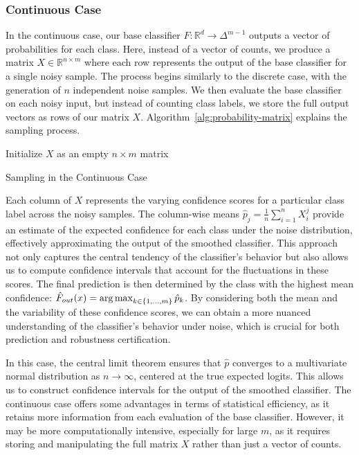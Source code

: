 \subsubsection{Continuous Case}\label{subsubsec:continuous-case-monte-carlo-simulation}
In the continuous case, our base classifier $F: \mathbb{R}^d \rightarrow \Delta^{m-1}$ outputs a vector of probabilities for each class.
Here, instead of a vector of counts, we produce a matrix $X \in \mathbb{R}^{n \times m}$ where each row represents the output of the base classifier for a single noisy sample.
The process begins similarly to the discrete case, with the generation of $n$ independent noise samples.
We then evaluate the base classifier on each noisy input, but instead of counting class labels, we store the full output vectors as rows of our matrix $X$.
Algorithm~\ref{alg:probability-matrix} explains the sampling process.
\begin{algorithm}[h]
    \DontPrintSemicolon
    Initialize $X$ as an empty $n \times m$ matrix\;
    \caption{Sampling in the Continuous Case}\label{alg:probability-matrix}
\end{algorithm}

Each column of $X$ represents the varying confidence scores for a particular class label across the noisy samples.
The column-wise means $\hat{p}_j = \frac{1}{n} \sum_{i=1}^n X_i^j$ provide an estimate of the expected confidence for each class under the noise distribution, effectively approximating the output of the smoothed classifier.
This approach not only captures the central tendency of the classifier's behavior but also allows us to compute confidence intervals that account for the fluctuations in these scores.
The final prediction is then determined by the class with the highest mean confidence: $\hat{F}_{out}(x) = \operatorname*{arg\,max}_{k \in \{1, \ldots, m\}} \hat{p}_k$.
By considering both the mean and the variability of these confidence scores, we can obtain a more nuanced understanding of the classifier's behavior under noise, which is crucial for both prediction and robustness certification.

In this case, the central limit theorem ensures that $\hat{p}$ converges to a multivariate normal distribution as $n \rightarrow \infty$, centered at the true expected logits.
This allows us to construct confidence intervals for the output of the smoothed classifier.
The continuous case offers some advantages in terms of statistical efficiency, as it retains more information from each evaluation of the base classifier.
However, it may be more computationally intensive, especially for large $m$, as it requires storing and manipulating the full matrix $X$ rather than just a vector of counts.

